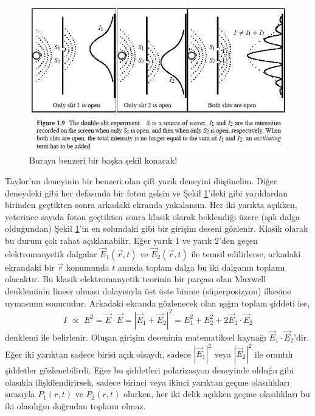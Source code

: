 \documentclass[a4paper,12pt, twoside]{article}
\begin{document}


\begin{figure}[hbtp]
\center
\includegraphics[scale=.8]{Double-slit_experiment_unknown_source.png}
\caption{Buraya benzeri bir başka şekil konacak!}
\label{fig:dobule_slit_experiment}
\end{figure}

Taylor'un deneyinin bir benzeri olan çift yarık deneyini düşünelim. Diğer deneydeki gibi her defasında bir foton gelsin ve Şekil \ref{fig:dobule_slit_experiment}'deki gibi yarıklardan birinden geçtikten sonra arkadaki ekranda yakalansın. Her iki yarıkta açıkken, yeterince sayıda foton geçtikten sonra klasik olarak beklendiği üzere (ışık dalga olduğundan) Şekil \ref{fig:dobule_slit_experiment}'in en solundaki gibi bir girişim deseni gözlenir. Klasik olarak bu durum çok rahat açıklanabilir. Eğer yarık 1 ve yarık 2'den geçen elektromanyetik dalgalar $\vec E_1(\vec r, t)$ ve $\vec E_2(\vec r, t)$ ile temsil edilirlerse, arkadaki ekrandaki bir $\vec r$ konumunda $t$ anında toplam dalga bu iki dalganın toplamı olacaktır. Bu klasik elektromanyetik teorinin bir parçası olan Maxwell denkleminin lineer olması dolayısıyla üst üste binme (süperposizyon) ilkesine uymasının sonucudur. Arkadaki ekranda gözlenecek olan ışığın toplam şiddeti ise,
\begin{equation}
I \,\, \propto\,\, E^2 = \vec E \cdot \vec E = |\vec E_1 + \vec E_2|^2 = E_1^2 + E_2^2 + 2\vec E_1 \cdot \vec E_2
\label{eq:foton_interference}
\end{equation}
denklemi ile belirlenir. Oluşan girişim deseninin matematiksel kaynağı $\vec E_1 \cdot \vec E_2$'dir. Eğer iki yarıktan sadece birisi açık olsaydı, sadece $|\vec E_1|^2$ veya $|\vec E_2|^2$ ile orantılı şiddetler gözlenebilirdi. Eğer bu şiddetleri polarizasyon deneyinde olduğu gibi olasıkla ilişkilendirirsek, sadece birinci veya ikinci yarıktan geçme olasılıkları sırasıyla $P_1(r,t)$ ve $P_2(r,t)$ olurken, her iki delik açıkken geçme olasılıkları bu iki olasılığın doğrudan toplamı olmaz.
\end{document}
